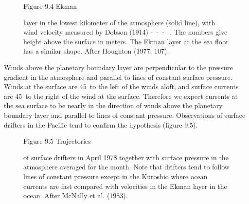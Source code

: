 \begin{figure}[b!]
\footnotesize
Figure 9.4 Ekman \rule{0mm}{3ex}layer in the lowest kilometer of the
atmosphere (solid line), with wind velocity measured by Dobson (1914)
-\ -\ - \ . The numbers give height above the surface in meters. The
Ekman layer at the sea floor has a similar shape. After Houghton
(1977: 107).
\label{fig:bottomekman}
\end{figure}

Winds above the planetary boundary layer are perpendicular to the
pressure gradient in the atmosphere and parallel to lines of constant
surface pressure.  Winds at the surface are 45\degrees\ to the left of
the winds aloft, and surface currents are 45\degrees\ to the right of
the wind at the surface. Therefore we expect currents at the sea
surface to be nearly in the direction of winds above the planetary
boundary layer and parallel to lines of constant
pressure. Observations of surface drifters
in the Pacific tend to confirm the hypothesis (figure 9.5).

\begin{figure}[t!]
\footnotesize
Figure 9.5 Trajectories \rule{0mm}{3ex}of surface
drifters in April 1978 together with
surface pressure in the atmosphere averaged for the month. Note that
drifters tend to follow lines of constant pressure except in the
Kuroshio where ocean currents are
fast compared with velocities in the Ekman layer in the ocean. After
McNally et al. (1983).
\label{drifterplot}
\vspace{-3ex}
\end{figure}

